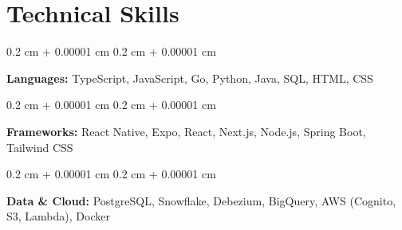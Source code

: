 \documentclass[10pt, letterpaper]{article}
\newenvironment{highlights}{
    \begin{itemize}[
        topsep=0.10 cm,
        parsep=0.10 cm,
        partopsep=0pt,
        itemsep=0pt,
        leftmargin=0.4 cm + 10pt
    ]
}{
    \end{itemize}
} %
\newenvironment{onecolentry}{
    \begin{adjustwidth}{
        0.2 cm + 0.00001 cm
    }{
        0.2 cm + 0.00001 cm
    }
}{
    \end{adjustwidth}
} %
\newenvironment{twocolentry}[2][]{
    \onecolentry
    \def\secondColumn{#2}
    \setcolumnwidth{\fill, 4.5 cm}
    \begin{paracol}{2}
}{
    \switchcolumn \raggedleft \secondColumn
    \end{paracol}
    \endonecolentry
} %
\begin{document}

            
            


    
    \section{Technical Skills}

        
        \begin{onecolentry}
            \textbf{Languages:} TypeScript, JavaScript, Go, Python, Java, SQL, HTML, CSS
        \end{onecolentry}

        \begin{onecolentry}
            \textbf{Frameworks:} React Native, Expo, React, Next.js, Node.js, Spring Boot, Tailwind CSS
        \end{onecolentry}

        \begin{onecolentry}
            \textbf{Data \& Cloud:} PostgreSQL, Snowflake, Debezium, BigQuery, AWS (Cognito, S3, Lambda), Docker
        \end{onecolentry}
\end{document}
